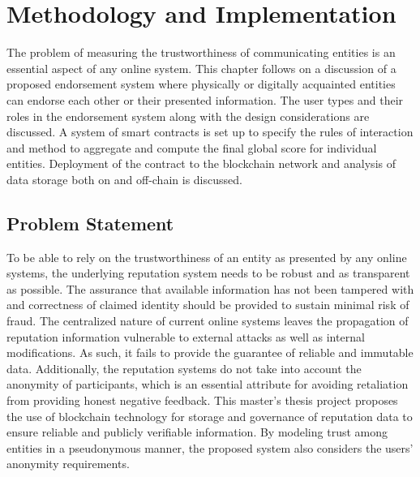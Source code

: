 \chapter{Methodology and Implementation} \label{ch:method}
The problem of measuring the trustworthiness of communicating entities is an
essential aspect of any online system. This chapter follows on a discussion of
a proposed endorsement system where physically or digitally acquainted entities
can endorse each other or their presented information. The user types and their
roles in the endorsement system along with the design considerations are
discussed. A system of smart contracts is set up to specify the rules of
interaction and method to aggregate and compute the final global score for
individual entities. Deployment of the contract to the blockchain network and
analysis of data storage both on and off-chain is discussed. 

\section{Problem Statement}
To be able to rely on the trustworthiness of an entity as presented by any
online systems, the underlying reputation system needs to be robust and as
transparent as possible. The assurance that available information has not been
tampered with and correctness of claimed identity should be provided to sustain
minimal risk of fraud. The centralized nature of current online systems leaves
the propagation of reputation information vulnerable to external attacks as
well as internal modifications. As such, it fails to provide the guarantee of
reliable and immutable data. Additionally, the reputation systems do not take
into account the anonymity of participants, which is an essential attribute for
avoiding retaliation from providing honest negative feedback. This master's
thesis project proposes the use of blockchain technology for storage and
governance of reputation data to ensure reliable and publicly verifiable
information. By modeling trust among entities in a pseudonymous manner, the
proposed system also considers the users' anonymity requirements.

